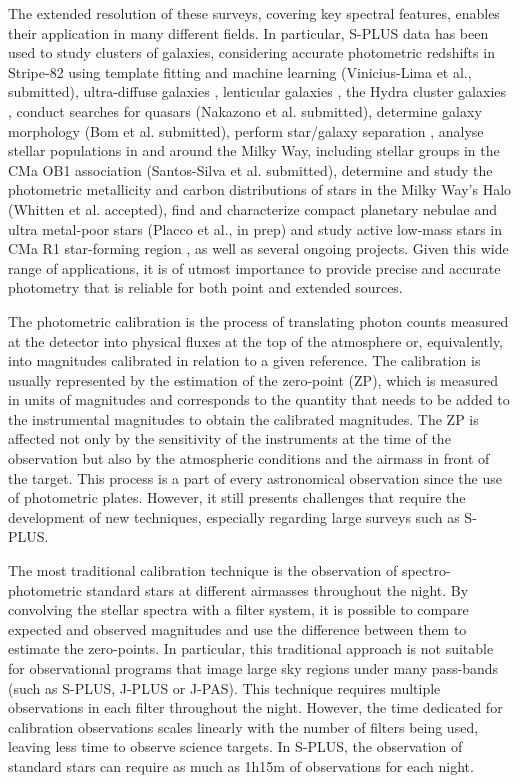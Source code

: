 \documentclass[fleqn,usenatbib]{mnras}
\begin{document}
The extended resolution of these surveys, covering key spectral features, enables their application in many different fields. In particular, S-PLUS data has been used to study clusters of galaxies, considering accurate photometric redshifts in Stripe-82 using template fitting \citep{Molino+2020} and machine learning (Vinicius-Lima et al., submitted), ultra-diffuse galaxies \citep{Barbosa+2020}, lenticular galaxies \citep{Cortesi+21}, the Hydra cluster galaxies  \citep{Lima-Dias+2021}, conduct searches for quasars (Nakazono et al. submitted), determine galaxy morphology (Bom et al. submitted), perform star/galaxy separation \citep{Costa-Duarte+2019}, analyse stellar populations in and around the Milky Way, including stellar groups in the CMa OB1 association (Santos-Silva et al. submitted), determine and study the photometric metallicity and carbon distributions of stars in the Milky Way’s Halo (Whitten et al. accepted), find and characterize compact planetary nebulae \citep{GutierrezSoto+2020} and ultra metal-poor stars (Placco et al., in prep) and study active low-mass stars in CMa R1 star-forming region \citep{Gregorio-Hetem+2021}, as well as several ongoing projects. Given this wide range of applications, it is of utmost importance to provide precise and accurate photometry that is reliable for both point and extended sources.

The photometric calibration is the process of translating photon counts measured at the detector into physical fluxes at the top of the atmosphere or, equivalently, into magnitudes calibrated in relation to a given reference. The calibration is usually represented by the estimation of the zero-point (ZP), which is measured in units of magnitudes and corresponds to the quantity that needs to be added to the instrumental magnitudes to obtain the calibrated magnitudes. The ZP is affected not only by the sensitivity of the instruments at the time of the observation but also by the atmospheric conditions and the airmass in front of the target. This process is a part of every astronomical observation since the use of photometric plates. However, it still presents challenges that require the development of new techniques, especially regarding large surveys such as S-PLUS.

The most traditional calibration technique is the observation of spectro-photometric standard stars \citep{Gregg+2006, LeBorgne+2003} at different airmasses throughout the night. By convolving the stellar spectra with a filter system, it is possible to compare expected and observed magnitudes and use the difference between them to estimate the zero-points. In particular, this traditional approach is not suitable for observational programs that image large sky regions under many pass-bands (such as S-PLUS, J-PLUS or J-PAS). This technique requires multiple observations in each filter throughout the night. However, the time dedicated for calibration observations scales linearly with the number of filters being used, leaving less time to observe science targets. In S-PLUS, the observation of standard stars can require as much as 1h15m of observations for each night.
\end{document}

